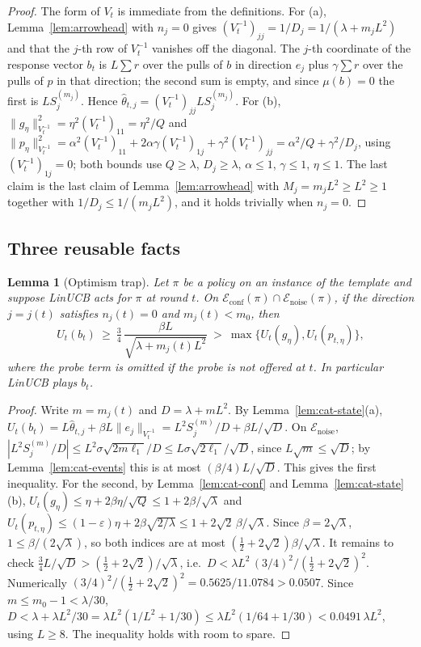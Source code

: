 \documentclass{article}
\newtheorem{lemma}{Lemma}
\theoremstyle{definition}
\theoremstyle{remark}
\newcommand{\eps}{\varepsilon}
\theoremstyle{remark}
\begin{document}
\begin{proof}
The form of $V_t$ is immediate from the definitions. For (a), Lemma~\ref{lem:arrowhead}
with $n_j=0$ gives $(V_t^{-1})_{jj}=1/D_j=1/(\lambda+m_jL^2)$ and that the $j$-th
row of $V_t^{-1}$ vanishes off the diagonal. The $j$-th coordinate of the
response vector $b_t$ is $L\sum r$ over the pulls of $b$ in direction $e_j$
plus $\gamma\sum r$ over the pulls of $p$ in that direction; the second sum is
empty, and since $\mu(b)=0$ the first is $LS_j^{(m_j)}$. Hence
$\widehat\theta_{t,j}=(V_t^{-1})_{jj}LS_j^{(m_j)}$. For (b),
$\|g_\eta\|^2_{V_t^{-1}}=\eta^2(V_t^{-1})_{11}=\eta^2/Q$ and
$\|p_\eta\|^2_{V_t^{-1}}=\alpha^2(V_t^{-1})_{11}+2\alpha \gamma(V_t^{-1})_{1j}+\gamma^2(V_t^{-1})_{jj}
=\alpha^2/Q+\gamma^2/D_j$, using $(V_t^{-1})_{1j}=0$; both bounds use $Q\ge\lambda$,
$D_j\ge\lambda$, $\alpha\le1$, $\gamma\le1$, $\eta\le1$. The last claim is the last
claim of Lemma~\ref{lem:arrowhead} with $M_j=m_jL^2\ge L^2\ge1$ together with
$1/D_j\le1/(m_jL^2)$, and it holds trivially when $n_j=0$.
\end{proof}

\subsection{Three reusable facts}

\begin{lemma}[Optimism trap]
\label{lem:cat-trap}
Let $\pi$ be a policy on an instance of the template and suppose LinUCB acts
for $\pi$ at round $t$. On $\mathcal E_{\mathrm{conf}}(\pi)\cap\mathcal E_{\mathrm{noise}}(\pi)$,
if the direction $j=j(t)$ satisfies $n_j(t)=0$ and $m_j(t)<m_0$, then
\[
U_t(b_t)\ \ge\ \tfrac34\,\frac{\beta L}{\sqrt{\lambda+m_j(t)L^2}}\ >\ \max\{U_t(g_\eta),U_t(p_{t,\eta})\},
\]
where the probe term is omitted if the probe is not offered at $t$. In
particular LinUCB plays $b_t$.
\end{lemma}

\begin{proof}
Write $m=m_j(t)$ and $D=\lambda+mL^2$. By Lemma~\ref{lem:cat-state}(a),
$U_t(b_t)=L\widehat\theta_{t,j}+\beta L\|e_j\|_{V_t^{-1}}=L^2S_j^{(m)}/D+\beta L/\sqrt D$.
On $\mathcal E_{\mathrm{noise}}$, $|L^2S_j^{(m)}/D|\le L^2\sigma\sqrt{2m\ell_1}/D\le L\sigma\sqrt{2\ell_1}/\sqrt D$,
since $L\sqrt m\le\sqrt D$; by Lemma~\ref{lem:cat-events} this is at most
$(\beta/4)L/\sqrt D$. This gives the first inequality. For the second, by
Lemma~\ref{lem:cat-conf} and Lemma~\ref{lem:cat-state}(b),
$U_t(g_\eta)\le\eta+2\beta\eta/\sqrt Q\le1+2\beta/\sqrt\lambda$ and
$U_t(p_{t,\eta})\le(1-\eps)\eta+2\beta\sqrt{2/\lambda}\le1+2\sqrt2\,\beta/\sqrt\lambda$.
Since $\beta=2\sqrt\lambda$, $1\le\beta/(2\sqrt\lambda)$, so both indices are at
most $(\tfrac12+2\sqrt2)\beta/\sqrt\lambda$. It remains to check
$\tfrac34L/\sqrt D>(\tfrac12+2\sqrt2)/\sqrt\lambda$, i.e.\
$D<\lambda L^2\,(3/4)^2/(\tfrac12+2\sqrt2)^2$. Numerically
$(3/4)^2/(\tfrac12+2\sqrt2)^2=0.5625/11.0784>0.0507$. Since $m\le m_0-1<\lambda/30$,
$D<\lambda+\lambda L^2/30=\lambda L^2(1/L^2+1/30)\le\lambda L^2(1/64+1/30)<0.0491\,\lambda L^2$,
using $L\ge8$. The inequality holds with room to spare.
\end{proof}
\end{document}
